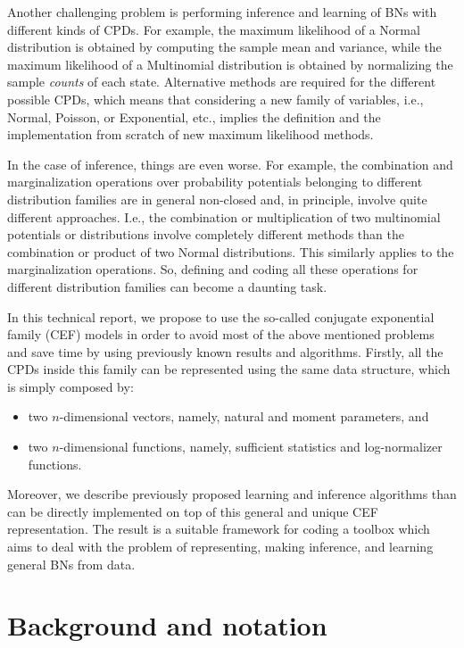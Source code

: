 \documentclass[11pt, oneside]{article}   	%
\numberwithin{figure}{section}
\numberwithin{equation}{section}
\numberwithin{table}{section}
\theoremstyle{definition}
\begin{document}
Another challenging problem is performing inference and learning of BNs with different kinds of CPDs. For example, the maximum likelihood of a Normal distribution is obtained by computing the sample mean and variance, while the maximum likelihood of a Multinomial distribution is obtained by normalizing the sample \textit{counts} of each state. Alternative methods are required for the different possible CPDs, which means that considering a new family of variables, i.e., Normal, Poisson, or Exponential, etc., implies the definition and the implementation from scratch of new maximum likelihood methods.  

In the case of inference, things are even worse. For example, the combination and marginalization operations over probability potentials belonging to different distribution families are in general non-closed and, in principle, involve quite different approaches. I.e., the combination or multiplication of two multinomial potentials or distributions involve completely different methods than the combination or product of two Normal distributions. This similarly applies to the marginalization operations. So, defining and coding all these operations for different distribution families can become a daunting task. 

In this technical report, we propose to use the so-called conjugate exponential family (CEF) models in order to avoid most of the above mentioned problems and save time by using previously known results and algorithms. Firstly, all the CPDs inside this family can be represented using the same data structure, which is simply composed by: 

\begin{itemize}
\item two $n$-dimensional vectors, namely, natural and moment parameters, and
\item two $n$-dimensional functions, namely, sufficient statistics and log-normalizer functions.
\end{itemize}

Moreover, we describe previously proposed learning and inference algorithms than can be directly implemented on top of this general and unique CEF representation. The result is a suitable framework for coding a toolbox which aims to deal with the problem of representing, making inference, and learning general BNs from data.

\section{Background and notation}
\end{document}
